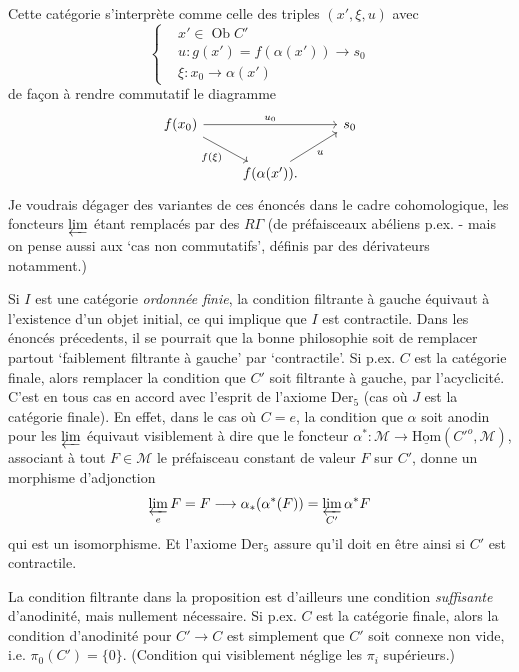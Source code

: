 \documentclass[11pt]{article}
\newcommand{\printedpage}[1]{\marginpar{\footnotesize p.~#1}}
\newcommand{\msp}[1]{\marginpar{\footnotesize [#1]}}
\begin{document}
\msp{page 3}

Cette catégorie s'interprète comme celle des triples $(x', \xi, u)$ avec
\[
\left\{
\begin{aligned}
& x' \in \operatorname{Ob} C' \\
& u : g(x') = f(\alpha(x')) \longrightarrow s_0 \\
& \xi : x_0 \longrightarrow \alpha(x')
\end{aligned}
\right.
\]
 de façon à rendre commutatif le diagramme
\[
\begin{tikzcd}
f(x_0) \arrow[rr, "u_0"] \arrow[dr, "f(\xi)"'] & & s_0 \\
 & f(\alpha(x')). \arrow[ur, "u"'] &
\end{tikzcd}
\]
Je voudrais dégager des variantes de ces énoncés dans le cadre cohomologique, les foncteurs $\varprojlim$ étant remplacés par des $R\Gamma$ (de préfaisceaux abéliens p.ex. - mais on pense aussi aux `cas non commutatifs', définis par des dérivateurs notamment.)

\clearpage

\printedpage{3}

Si $I$ est une catégorie \textit{ordonnée finie}, la condition filtrante à gauche équivaut à l'existence d'un objet initial, ce qui implique que $I$ est contractile. Dans les énoncés précedents, il se pourrait que la bonne philosophie soit de remplacer partout `faiblement filtrante à gauche' par `contractile'. Si p.ex. $C$ est la catégorie finale, alors remplacer la condition que $C'$ soit filtrante à gauche, par l'acyclicité. C'est en tous cas en accord avec l'esprit de l'axiome $\mathrm{Der}_5$ (cas où $J$ est la catégorie finale). En effet, dans le cas où $C = e$, la condition que $\alpha$ soit anodin pour les $\varprojlim$ équivaut visiblement à dire que le foncteur $\alpha^* : \mathcal{M} \longrightarrow \underline{\mathrm{Hom}}(C'^{o}, \mathcal{M})$, associant à tout $F \in \mathcal{M}$ le préfaisceau constant de valeur $F$ %
\msp{page 4}
sur $C'$, donne un morphisme d'adjonction
\[ \varprojlim_{e} F = F \longrightarrow \alpha_*(\alpha^*(F)) = \varprojlim_{C'} \alpha^* F \]
qui est un isomorphisme. Et l'axiome $\mathrm{Der}_5$ assure qu'il doit en être ainsi si $C'$ est contractile.

La condition filtrante dans la proposition est d'ailleurs une condition \textit{suffisante} d'anodinité, mais nullement nécessaire. Si p.ex. $C$ est la catégorie finale, alors la condition d'anodinité pour $C' \longrightarrow C$ est simplement que $C'$ soit connexe non vide, i.e. $\pi_0(C') = \{0\}$. (Condition qui visiblement néglige les $\pi_i$ supérieurs.)
\end{document}
